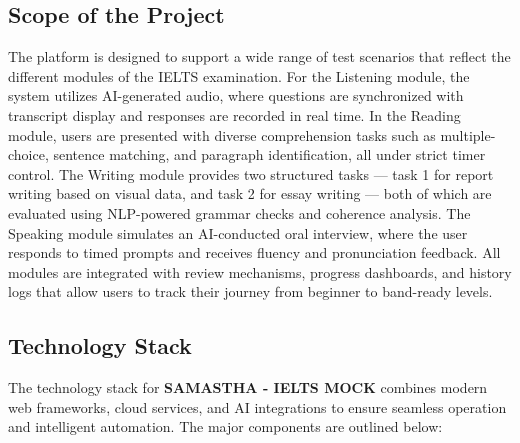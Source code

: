 \documentclass[a4paper,12pt]{article}
\begin{document}
\subsection{Scope of the Project}

The platform is designed to support a wide range of test scenarios that reflect the different modules of the IELTS examination. For the Listening module, the system utilizes AI-generated audio, where questions are synchronized with transcript display and responses are recorded in real time. In the Reading module, users are presented with diverse comprehension tasks such as multiple-choice, sentence matching, and paragraph identification, all under strict timer control. The Writing module provides two structured tasks — task 1 for report writing based on visual data, and task 2 for essay writing — both of which are evaluated using NLP-powered grammar checks and coherence analysis. The Speaking module simulates an AI-conducted oral interview, where the user responds to timed prompts and receives fluency and pronunciation feedback. All modules are integrated with review mechanisms, progress dashboards, and history logs that allow users to track their journey from beginner to band-ready levels.

\vspace{0.5cm}

\subsection{Technology Stack}

The technology stack for \textbf{SAMASTHA - IELTS MOCK} combines modern web frameworks, cloud services, and AI integrations to ensure seamless operation and intelligent automation. The major components are outlined below:
\end{document}
